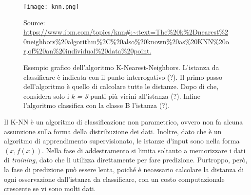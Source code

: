 \begin{figure}[h]
	\begin{center}
		\texttt{[image: knn.png]}
		\caption{Esempio grafico dell'algoritmo K-Nearest-Neighbors.
			L'istanza da classificare è indicata con il punto interrogativo (?).
			Il primo passo dell'algoritmo è quello di calcolare tutte le distanze. Dopo di che, considera solo i \emph{k = 3} punti più vicini all'istanza (?). Infine l'algoritmo classifica con la classe B l'istanza (?).
		} 
		Source: \url{https://www.ibm.com/topics/knn#:~:text=The%20k%2Dnearest%20neighbors%20algorithm%2C%20also%20known%20as%20KNN%20or,of%20an%20individual%20data%20point.}\label{fig:knn}
	\end{center}
\end{figure}

Il K-NN è un algoritmo di classificazione non parametrico, ovvero non fa alcuna assunzione sulla forma della distribuzione dei dati. Inoltre, dato che è un algoritmo di apprendimento supervisionato, le istanze d'input sono nella forma $(x, f(x))$. Nella fase di 
addestramento si limita soltanto a memorizzare i dati di \emph{training}, dato che li utilizza direttamente per fare predizione. Purtroppo, però, la fase di predizione può essere lenta, poiché è necessario calcolare la distanza di ogni osservazione dall'istanza da classificare, con un costo computazionale crescente se vi sono molti dati.

